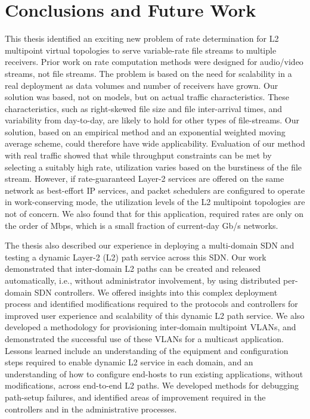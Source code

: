 \chapter{Conclusions and Future Work}
\label{sec:conclusion}

This thesis identified an exciting new problem
of rate determination for L2 multipoint virtual topologies
to serve variable-rate file streams to multiple receivers. Prior work
on rate computation methods were designed for audio/video
streams, not file streams. The problem is based on the need
for scalability in a real deployment as data volumes and
number of receivers have grown. Our solution was based, not
on models, but on actual traffic characteristics. These
characteristics, such as right-skewed file size and file
inter-arrival times, and variability from day-to-day,
are likely to hold for other types of file-streams.
Our solution, based on an empirical method and an exponential weighted moving average scheme, could therefore have wide applicability.
Evaluation of our method with real traffic showed that
while throughput constraints can be met by selecting a suitably high
rate, utilization varies based on the burstiness of the file stream.
However, if rate-guaranteed Layer-2 services are offered
on the same network as best-effort IP services, and packet schedulers
are configured to operate in work-conserving mode, the utilization levels
of the L2 multipoint topologies are not of concern. 
We also found that for this application, required rates are only on
the order of Mbps, which is a small fraction of current-day Gb/s networks.

The thesis also described our experience in deploying a multi-domain SDN and testing
a dynamic Layer-2 (L2) path service across this SDN. Our work demonstrated that inter-domain L2 paths can be created and released automatically, i.e., without administrator involvement, by using distributed per-domain SDN controllers.
We offered insights into this complex deployment process
and identified modifications required to the protocols and controllers
for improved user experience and scalability of this dynamic L2 path service. We also developed a methodology for provisioning inter-domain multipoint VLANs, and demonstrated
the successful use of these VLANs for a multicast application. Lessons learned include an understanding of the equipment
and configuration steps required to enable dynamic L2 service in each domain, and an understanding of how to configure end-hosts to run existing applications, without modifications, across end-to-end L2 paths. We developed methods for debugging path-setup failures, and identified
areas of improvement required in the controllers and in the administrative processes.

